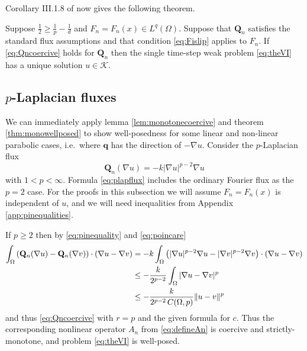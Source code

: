 \documentclass[final,leqno,onefignum,onetabnum]{siamltex1213bueler}
\newcommand\bq{\mathbf{q}}
\newcommand\bQ{\mathbf{Q}}
\renewcommand{\grad}{\nabla}
\begin{document}
\medskip
Corollary III.1.8 of \cite{KinderlehrerStampacchia1980} now gives the following theorem.

\medskip
\begin{theorem}  \label{thm:monowellposed}  Suppose $\frac{1}{2} \ge \frac{1}{p} - \frac{1}{d}$ and $F_n=F_n(x)\in L^q(\Omega)$.  Suppose that $\bQ_n$ satisfies the standard flux assumptions and that condition \eqref{eq:Fislip} applies to $F_n$.  If \eqref{eq:Qncoercive} holds for $\bQ_n$ then the single time-step weak problem \eqref{eq:theVI} has a unique solution $u\in\mathcal{K}$.
\end{theorem}

\subsection{$p$-Laplacian fluxes} \label{subsec:plap}  We can immediately apply lemma \ref{lem:monotonecoercive} and theorem \ref{thm:monowellposed} to show well-posedness for some linear and non-linear parabolic cases, i.e.~where $\bq$ has the direction of $-\grad u$.  Consider the $p$-Laplacian \cite{Evans1998} flux
\begin{equation}
  \bQ_n(\grad u) = - k |\grad u|^{p-2} \grad u \label{eq:plapflux}
\end{equation}
with $1<p<\infty$.  Formula \eqref{eq:plapflux} includes the ordinary Fourier flux as the $p=2$ case.  For the proofs in this subsection we will assume $F_n=F_n(x)$ is independent of $u$, and we will need inequalities from Appendix \ref{app:pinequalities}.

If $p\ge 2$ then by \eqref{eq:pinequality} and \eqref{eq:poincare}
\begin{align}
\int_\Omega \left(\bQ_n(\grad u) - \bQ_n(\grad v)\right)\cdot (\grad u - \grad v) &= -k  \int_\Omega \left(|\grad u|^{p-2} \grad u - |\grad v|^{p-2} \grad v\right)\cdot (\grad u - \grad v) \notag \\
  &\le - \frac{k}{2^{p-2}} \int_\Omega |\grad u - \grad v|^p \notag \\
  &\le - \frac{k}{2^{p-2}\,C(\Omega,p)} \|u-v\|^p \label{eq:plapQnmono}
\end{align}
and thus \eqref{eq:Qncoercive} with $r=p$ and the given formula for $c$.  Thus the corresponding nonlinear operator $A_n$ from \eqref{eq:defineAn} is coercive and strictly-monotone, and problem \eqref{eq:theVI} is well-posed.
\end{document}
